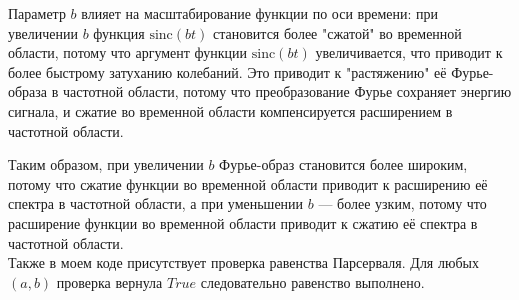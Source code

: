 \documentclass[a4paper,12pt]{article}
\begin{document}
Параметр \( b \) влияет на масштабирование функции по оси времени: при увеличении \( b \) функция \( \text{sinc}(b t) \) становится более "сжатой" во временной области, потому что аргумент функции \( \text{sinc}(b t) \) увеличивается, что приводит к более быстрому затуханию колебаний. Это приводит к "растяжению" её Фурье-образа в частотной области, потому что преобразование Фурье сохраняет энергию сигнала, и сжатие во временной области компенсируется расширением в частотной области.

Таким образом, при увеличении \( b \) Фурье-образ становится более широким, потому что сжатие функции во временной области приводит к расширению её спектра в частотной области, а при уменьшении \( b \) — более узким, потому что расширение функции во временной области приводит к сжатию её спектра в частотной области.\\


Также в моем коде присутствует проверка равенства Парсерваля. Для любых \( (a, b) \) проверка вернула \( True\) следовательно равенство выполнено.
\end{document}
